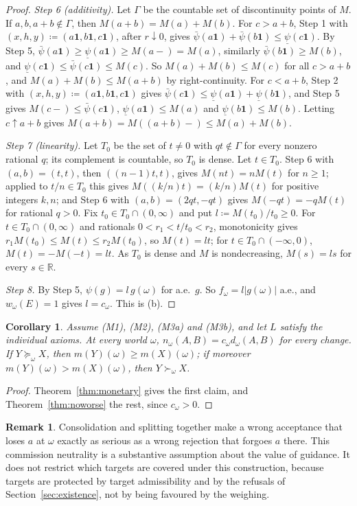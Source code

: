 \documentclass[11pt]{article}
\newtheorem{corollary}[theorem]{Corollary}
\theoremstyle{definition}
\newtheorem{remark}[theorem]{Remark}
\newcommand{\R}{\mathbb R}
\newcommand{\one}{\mathbf 1}
\begin{document}
\begin{proof}
\emph{Step 6 (additivity).} Let $\Gamma$ be the countable set of discontinuity points of $M$. If $a,b,a+b\notin\Gamma$, then $M(a+b)=M(a)+M(b)$. For $c>a+b$, Step 1 with $(x,h,y)\coloneqq(a\one,b\one,c\one)$, after $r\downarrow0$, gives $\bar\psi(a\one)+\bar\psi(b\one)\le\underline\psi(c\one)$. By Step 5, $\bar\psi(a\one)\ge\underline\psi(a\one)\ge M(a-)=M(a)$, similarly $\bar\psi(b\one)\ge M(b)$, and $\underline\psi(c\one)\le\bar\psi(c\one)\le M(c)$. So $M(a)+M(b)\le M(c)$ for all $c>a+b$, and $M(a)+M(b)\le M(a+b)$ by right-continuity. For $c<a+b$, Step 2 with $(x,h,y)\coloneqq(a\one,b\one,c\one)$ gives $\bar\psi(c\one)\le\underline\psi(a\one)+\underline\psi(b\one)$, and Step 5 gives $M(c-)\le\bar\psi(c\one)$, $\underline\psi(a\one)\le M(a)$ and $\underline\psi(b\one)\le M(b)$. Letting $c\uparrow a+b$ gives $M(a+b)=M((a+b)-)\le M(a)+M(b)$.

\emph{Step 7 (linearity).} Let $T_0$ be the set of $t\ne0$ with $qt\notin\Gamma$ for every nonzero rational $q$; its complement is countable, so $T_0$ is dense. Let $t\in T_0$. Step 6 with $(a,b)=(t,t)$, then $((n-1)t,t)$, gives $M(nt)=nM(t)$ for $n\ge1$; applied to $t/n\in T_0$ this gives $M((k/n)t)=(k/n)M(t)$ for positive integers $k,n$; and Step 6 with $(a,b)=(2qt,-qt)$ gives $M(-qt)=-qM(t)$ for rational $q>0$. Fix $t_0\in T_0\cap(0,\infty)$ and put $l\coloneqq M(t_0)/t_0\ge0$. For $t\in T_0\cap(0,\infty)$ and rationals $0<r_1<t/t_0<r_2$, monotonicity gives $r_1M(t_0)\le M(t)\le r_2M(t_0)$, so $M(t)=lt$; for $t\in T_0\cap(-\infty,0)$, $M(t)=-M(-t)=lt$. As $T_0$ is dense and $M$ is nondecreasing, $M(s)=ls$ for every $s\in\R$.

\emph{Step 8.} By Step 5, $\psi(g)=l\,g(\omega)$ for a.e.\ $g$. So $f_\omega=l|g(\omega)|$ a.e., and $w_\omega(E)=1$ gives $l=c_\omega$. This is (b).
\end{proof}

\begin{corollary}\label{cor:payoff}
Assume (M1), (M2), (M3a) and (M3b), and let $L$ satisfy the individual axioms. At every world $\omega$, $n_\omega(A,B)=c_\omega d_\omega(A,B)$ for every change. If $Y\succeq_\omega X$, then $m(Y)(\omega)\ge m(X)(\omega)$; if moreover $m(Y)(\omega)>m(X)(\omega)$, then $Y\succ_\omega X$.
\end{corollary}
\begin{proof}
Theorem~\ref{thm:monetary} gives the first claim, and Theorem~\ref{thm:noworse} the rest, since $c_\omega>0$.
\end{proof}

\begin{remark}\label{rem:neutral}
Consolidation and splitting together make a wrong acceptance that loses $a$ at $\omega$ exactly as serious as a wrong rejection that forgoes $a$ there. This commission neutrality is a substantive assumption about the value of guidance. It does not restrict which targets are covered under this construction, because targets are protected by target admissibility and by the refusals of Section~\ref{sec:existence}, not by being favoured by the weighing.
\end{remark}
\endgroup
\end{document}
